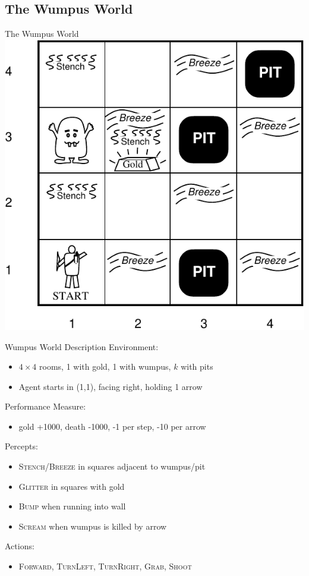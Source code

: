 \documentclass[14pt]{beamer}
\begin{document}
\subsection{The Wumpus World}

\begin{frame}[label=wumpus-world]{The Wumpus World}
\centering
\includegraphics[height=0.8\textheight]{wumpus-world}
\end{frame}

\begin{frame}[label=wumpus-world-defined]{Wumpus World Description}
Environment:
\begin{itemize}
\item $4 \times 4$ rooms, 1 with gold, 1 with wumpus, $k$ with pits
\item Agent starts in (1,1), facing right, holding 1 arrow
\end{itemize}
Performance Measure:
\begin{itemize}
\item gold +1000, death -1000, -1 per step, -10 per arrow
\end{itemize}
\pause
Percepts:
\pause
\begin{itemize}
\item \textsc{Stench}/\textsc{Breeze} in squares adjacent to wumpus/pit
\item \textsc{Glitter} in squares with gold
\item \textsc{Bump} when running into wall
\item \textsc{Scream} when wumpus is killed by arrow
\end{itemize}
\pause
Actions:
\pause
\begin{itemize}
\item \textsc{Forward}, \textsc{TurnLeft}, \textsc{TurnRight}, \textsc{Grab}, \textsc{Shoot}
\end{itemize}
\end{frame}
\end{document}
